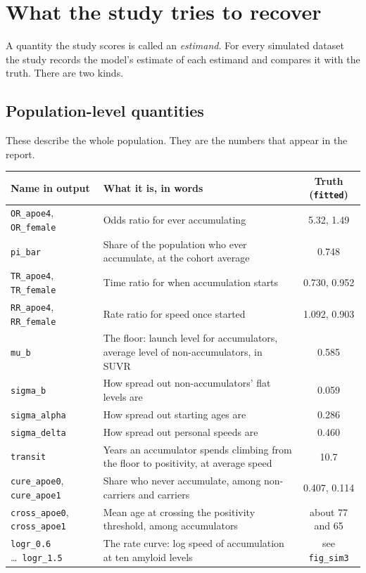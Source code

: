 \documentclass[11pt]{article}
\newcommand{\code}[1]{\texttt{\small #1}}
\begin{document}
\section{What the study tries to recover}

A quantity the study scores is called an \emph{estimand}. For every simulated dataset the study records the model's estimate of each estimand and compares it with the truth. There are two kinds.

\subsection{Population-level quantities}

These describe the whole population. They are the numbers that appear in the report.

\begin{center}
\small
\begin{tabularx}{\textwidth}{@{}l X c@{}}
\toprule
Name in output & What it is, in words & Truth (\code{fitted}) \\
\midrule
\code{OR\_apoe4}, \code{OR\_female} & Odds ratio for ever accumulating & 5.32, 1.49 \\
\code{pi\_bar} & Share of the population who ever accumulate, at the cohort average & 0.748 \\
\code{TR\_apoe4}, \code{TR\_female} & Time ratio for when accumulation starts & 0.730, 0.952 \\
\code{RR\_apoe4}, \code{RR\_female} & Rate ratio for speed once started & 1.092, 0.903 \\
\code{mu\_b} & The floor: launch level for accumulators, average level of non-accumulators, in SUVR & 0.585 \\
\code{sigma\_b} & How spread out non-accumulators' flat levels are & 0.059 \\
\code{sigma\_alpha} & How spread out starting ages are & 0.286 \\
\code{sigma\_delta} & How spread out personal speeds are & 0.460 \\
\code{transit} & Years an accumulator spends climbing from the floor to positivity, at average speed & 10.7 \\
\code{cure\_apoe0}, \code{cure\_apoe1} & Share who never accumulate, among non-carriers and carriers & 0.407, 0.114 \\
\code{cross\_apoe0}, \code{cross\_apoe1} & Mean age at crossing the positivity threshold, among accumulators & about 77 and 65 \\
\code{logr\_0.6} \ldots\ \code{logr\_1.5} & The rate curve: log speed of accumulation at ten amyloid levels & see \code{fig\_sim3} \\
\bottomrule
\end{tabularx}
\end{center}
\end{document}
